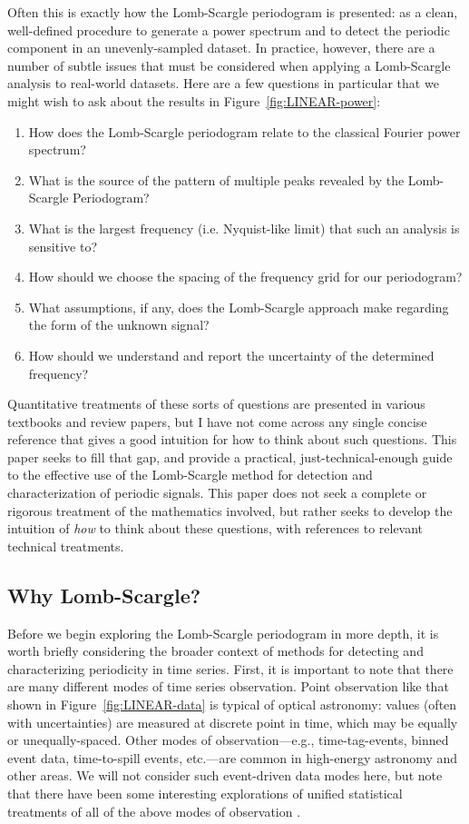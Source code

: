 \documentclass[preprint]{aastex}
\newcommand{\fig}[1]{Figure~\ref{fig:#1}}
\newcommand{\sectlabel}[1]{\label{sect:#1}}
\begin{document}
Often this is exactly how the Lomb-Scargle periodogram is presented: as a
clean, well-defined procedure to generate a power spectrum and to
detect the periodic component in an unevenly-sampled dataset.
In practice, however, there are a number of subtle issues that must be
considered when applying a Lomb-Scargle analysis to real-world datasets.
Here are a few questions in particular that we might wish to ask about
the results in \fig{LINEAR-power}:
\begin{enumerate}
  \item How does the Lomb-Scargle periodogram relate to the classical
    Fourier power spectrum?
  \item What is the source of the pattern of multiple peaks revealed by the
    Lomb-Scargle Periodogram?
  \item What is the largest frequency (i.e. Nyquist-like limit) that such
    an analysis is sensitive to?
  \item How should we choose the spacing of the frequency grid for our
    periodogram?
  \item What assumptions, if any, does the Lomb-Scargle approach make
    regarding the form of the unknown signal?
  \item How should we understand and report the uncertainty of the
    determined frequency?
\end{enumerate}
Quantitative treatments of these sorts of questions are presented in various
textbooks and review papers, but I have not come across any single concise
reference that gives a good intuition for how to think about such questions.
This paper seeks to fill that gap, and provide a practical,
just-technical-enough guide to the effective use of the Lomb-Scargle method
for detection and characterization of periodic signals.
This paper does not seek a complete or rigorous treatment of the mathematics
involved, but rather seeks to develop the intuition of {\it how} to think
about these questions, with references to relevant technical treatments.

\subsection{Why Lomb-Scargle?}
\sectlabel{why-lomb-scargle}

Before we begin exploring the Lomb-Scargle periodogram in more depth,
it is worth briefly considering the broader context of methods for
detecting and characterizing periodicity in time series.
First, it is important to note that there are many different modes of
time series observation.
Point observation like that shown in \fig{LINEAR-data} is typical of
optical astronomy: values (often with uncertainties) are measured at
discrete point in time, which may be equally or unequally-spaced.
Other modes of observation---e.g., time-tag-events, binned event data,
time-to-spill events, etc.---are common in high-energy astronomy and other
areas. We will not consider such event-driven data modes here, but note
that there have been some interesting explorations of unified statistical
treatments of all of the above modes of observation
\citep[e.g.][]{Scargle98, Scargle2002}.
\end{document}
